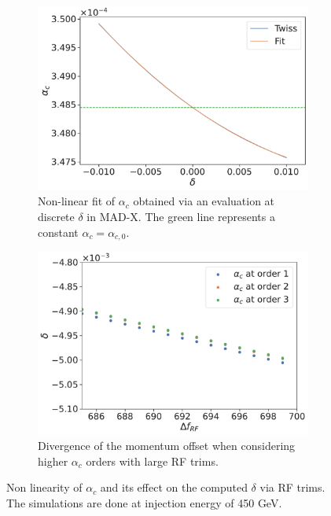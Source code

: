 \begin{figure}[!htb]
    \centering
    \begin{subfigure}[t]{0.48\textwidth}
        \centering
        \includegraphics[width=\textwidth]{images/higher_order_momentum_compaction_factor.pdf}
        \caption{Non-linear fit of $\alpha_c$ obtained via an evaluation at discrete $\delta$ in
        MAD-X. The green line represents a constant $\alpha_c = \alpha_{c,0}$.}
    \end{subfigure}
    \hfill
    \begin{subfigure}[t]{0.48\textwidth}
        \centering
        \includegraphics[width=\textwidth]{images/delta_vs_frf_alpha_c.pdf}
        \caption{Divergence of the momentum offset when considering higher $\alpha_c$ orders with
        large RF trims.}
    \end{subfigure}
    \caption{Non linearity of $\alpha_c$ and its effect on the computed $\delta$ via RF trims. The
    simulations are done at injection energy of 450 GeV.}
    \label{fig:decapoles:chromaticity:momentum_compaction_factor}
\end{figure}

